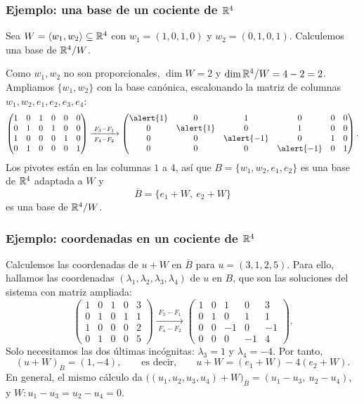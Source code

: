 \begin{frame}
    \frametitle{Ejemplo: una base de un cociente de $\mathbb{R}^4$}

    \begin{example}
        Sea $W=\langle w_1,w_2\rangle\subseteq\mathbb{R}^4$ con
        $w_1=(1,0,1,0)$ y $w_2=(0,1,0,1)$. Calculemos una base de $\mathbb{R}^4/W$.
    \end{example}

    Como $w_1,w_2$ no son proporcionales, $\dim W=2$ y
    $\dim\mathbb{R}^4/W=4-2=2$. Ampliamos $\{w_1,w_2\}$ con la base canónica,
    escalonando la matriz de columnas $w_1,w_2,e_1,e_2,e_3,e_4$:
    \[
        \begin{pmatrix}
            1&0&1&0&0&0\\
            0&1&0&1&0&0\\
            1&0&0&0&1&0\\
            0&1&0&0&0&1
        \end{pmatrix}
        \xrightarrow[\;F_4-F_2\;]{\;F_3-F_1\;}
        \begin{pmatrix}
            \alert{1}&0&1&0&0&0\\
            0&\alert{1}&0&1&0&0\\
            0&0&\alert{-1}&0&1&0\\
            0&0&0&\alert{-1}&0&1
        \end{pmatrix}.
    \]
    Los pivotes están en las columnas $1$ a $4$, así que
    $B=\{w_1,w_2,e_1,e_2\}$ es una base de $\mathbb{R}^4$ adaptada a $W$ y
    \[
        \overline{B}=\{e_1+W,\ e_2+W\}
    \]
    es una base de $\mathbb{R}^4/W$.
\end{frame}


\begin{frame}
    \frametitle{Ejemplo: coordenadas en un cociente de $\mathbb{R}^4$}

    Calculemos las coordenadas de $u+W$ en $\overline{B}$ para
    $u=(3,1,2,5)$. Para ello, hallamos las coordenadas $(\lambda_1,\lambda_2,\lambda_3,\lambda_4)$ de $u$ en $B$, que son las soluciones del sistema con matriz ampliada:
    \[
        \left(\begin{array}{cccc|c}
            1&0&1&0&3\\
            0&1&0&1&1\\
            1&0&0&0&2\\
            0&1&0&0&5
        \end{array}\right)
        \xrightarrow[\;F_4-F_2\;]{\;F_3-F_1\;}
        \left(\begin{array}{cccc|c}
            1&0&1&0&3\\
            0&1&0&1&1\\
            0&0&-1&0&-1\\
            0&0&0&-1&4
        \end{array}\right).
    \]
    Solo necesitamos las dos últimas incógnitas: $\lambda_3=1$ y
    $\lambda_4=-4$. Por tanto,
    \[
        (u+W)_{\overline{B}}=(1,-4),
        \qquad\text{es decir,}\qquad
        u+W=(e_1+W)-4(e_2+W).
    \]
    En general, el mismo cálculo da
    $\bigl((u_1,u_2,u_3,u_4)+W\bigr)_{\overline{B}}=(u_1-u_3,\ u_2-u_4)$,
    y $W\colon u_1-u_3=u_2-u_4=0$.
\end{frame}


